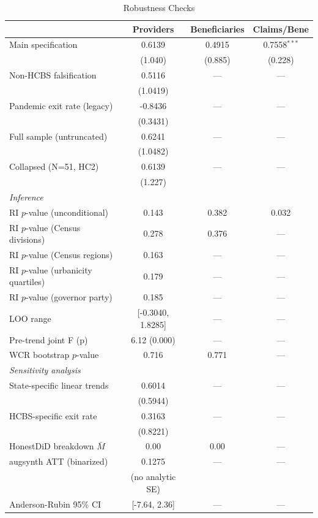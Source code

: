 \begin{table}[t]
\centering
\caption{Robustness Checks}
\label{tab:robustness}
\small
\begin{tabular}{lccc}
\toprule
 & Providers & Beneficiaries & Claims/Bene \\
\midrule
Main specification & 0.6139 & 0.4915 & 0.7558$^{***}$ \\
 & (1.040) & (0.885) & (0.228) \\
Non-HCBS falsification & 0.5116 & --- & --- \\
 & (1.0419) & & \\
Pandemic exit rate (legacy) & -0.8436 & --- & --- \\
 & (0.3431) & & \\
Full sample (untruncated) & 0.6241 & --- & --- \\
 & (1.0482) & & \\
Collapsed (N=51, HC2) & 0.6139 & --- & --- \\
 & (1.227) & & \\
\midrule
\multicolumn{4}{l}{\textit{Inference}} \\
RI $p$-value (unconditional) & 0.143 & 0.382 & 0.032 \\
RI $p$-value (Census divisions) & 0.278 & 0.376 & --- \\
RI $p$-value (Census regions) & 0.163 & --- & --- \\
RI $p$-value (urbanicity quartiles) & 0.179 & --- & --- \\
RI $p$-value (governor party) & 0.185 & --- & --- \\
LOO range & [-0.3040, 1.8285] & --- & --- \\
Pre-trend joint F (p) & 6.12 (0.000) & --- & --- \\
WCR bootstrap $p$-value & 0.716 & 0.771 & --- \\
\midrule
\multicolumn{4}{l}{\textit{Sensitivity analysis}} \\
State-specific linear trends & 0.6014 & --- & --- \\
 & (0.5944) & & \\
HCBS-specific exit rate & 0.3163 & --- & --- \\
 & (0.8221) & & \\
HonestDiD breakdown $\bar{M}$ & 0.00 & 0.00 & --- \\
augsynth ATT (binarized) & 0.1275 & --- & --- \\
 & (no analytic SE) & & \\
Anderson-Rubin 95\% CI & [-7.64, 2.36] & --- & --- \\

\end{tabular}
\end{table}
